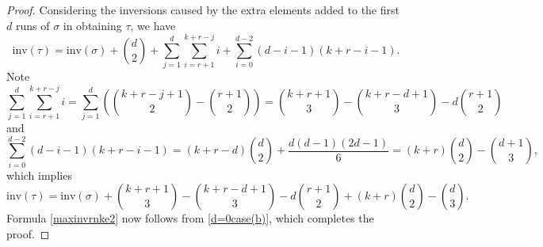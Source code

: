 \documentclass[10pt,a4paper]{amsart}
\theoremstyle{plain}
\begin{document}
\begin{proof}
Considering the inversions caused by the extra elements added to the first $d$ runs of $\sigma$ in obtaining $\tau$, we have
$$\text{inv}(\tau)=\text{inv}(\sigma)+\binom{d}{2}+\sum_{j=1}^d\sum_{i=r+1}^{k+r-j}i+\sum_{i=0}^{d-2}(d-i-1)(k+r-i-1).$$
Note
$$\sum_{j=1}^d\sum_{i=r+1}^{k+r-j}i=\sum_{j=1}^d\left(\binom{k+r-j+1}{2}-\binom{r+1}{2}\right)=\binom{k+r+1}{3}-\binom{k+r-d+1}{3}-d\binom{r+1}{2}$$
and
$$\sum_{i=0}^{d-2}(d-i-1)(k+r-i-1)=(k+r-d)\binom{d}{2}+\frac{d(d-1)(2d-1)}{6}=(k+r)\binom{d}{2}-\binom{d+1}{3},$$
which implies
$$\text{inv}(\tau)=\text{inv}(\sigma)+\binom{k+r+1}{3}-\binom{k+r-d+1}{3}-d\binom{r+1}{2}+(k+r)\binom{d}{2}-\binom{d}{3}.$$
Formula \eqref{maxinvrnke2} now follows from \eqref{d=0case(b)}, which completes the proof.
\end{proof}
\end{document}
